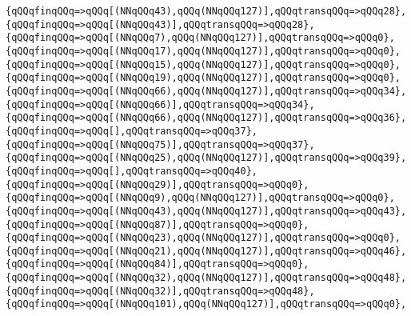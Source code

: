 \verb|{qQQqfinqQQq=>qQQq[(NNqQQq43),qQQq(NNqQQq127)],qQQqtransqQQq=>qQQq28},|\newline
\verb|{qQQqfinqQQq=>qQQq[(NNqQQq43)],qQQqtransqQQq=>qQQq28},|\newline
\verb|{qQQqfinqQQq=>qQQq[(NNqQQq7),qQQq(NNqQQq127)],qQQqtransqQQq=>qQQq0},|\newline
\verb|{qQQqfinqQQq=>qQQq[(NNqQQq17),qQQq(NNqQQq127)],qQQqtransqQQq=>qQQq0},|\newline
\verb|{qQQqfinqQQq=>qQQq[(NNqQQq15),qQQq(NNqQQq127)],qQQqtransqQQq=>qQQq0},|\newline
\verb|{qQQqfinqQQq=>qQQq[(NNqQQq19),qQQq(NNqQQq127)],qQQqtransqQQq=>qQQq0},|\newline
\verb|{qQQqfinqQQq=>qQQq[(NNqQQq66),qQQq(NNqQQq127)],qQQqtransqQQq=>qQQq34},|\newline
\verb|{qQQqfinqQQq=>qQQq[(NNqQQq66)],qQQqtransqQQq=>qQQq34},|\newline
\verb|{qQQqfinqQQq=>qQQq[(NNqQQq66),qQQq(NNqQQq127)],qQQqtransqQQq=>qQQq36},|\newline
\verb|{qQQqfinqQQq=>qQQq[],qQQqtransqQQq=>qQQq37},|\newline
\verb|{qQQqfinqQQq=>qQQq[(NNqQQq75)],qQQqtransqQQq=>qQQq37},|\newline
\verb|{qQQqfinqQQq=>qQQq[(NNqQQq25),qQQq(NNqQQq127)],qQQqtransqQQq=>qQQq39},|\newline
\verb|{qQQqfinqQQq=>qQQq[],qQQqtransqQQq=>qQQq40},|\newline
\verb|{qQQqfinqQQq=>qQQq[(NNqQQq29)],qQQqtransqQQq=>qQQq0},|\newline
\verb|{qQQqfinqQQq=>qQQq[(NNqQQq9),qQQq(NNqQQq127)],qQQqtransqQQq=>qQQq0},|\newline
\verb|{qQQqfinqQQq=>qQQq[(NNqQQq43),qQQq(NNqQQq127)],qQQqtransqQQq=>qQQq43},|\newline
\verb|{qQQqfinqQQq=>qQQq[(NNqQQq87)],qQQqtransqQQq=>qQQq0},|\newline
\verb|{qQQqfinqQQq=>qQQq[(NNqQQq23),qQQq(NNqQQq127)],qQQqtransqQQq=>qQQq0},|\newline
\verb|{qQQqfinqQQq=>qQQq[(NNqQQq21),qQQq(NNqQQq127)],qQQqtransqQQq=>qQQq46},|\newline
\verb|{qQQqfinqQQq=>qQQq[(NNqQQq84)],qQQqtransqQQq=>qQQq0},|\newline
\verb|{qQQqfinqQQq=>qQQq[(NNqQQq32),qQQq(NNqQQq127)],qQQqtransqQQq=>qQQq48},|\newline
\verb|{qQQqfinqQQq=>qQQq[(NNqQQq32)],qQQqtransqQQq=>qQQq48},|\newline
\verb|{qQQqfinqQQq=>qQQq[(NNqQQq101),qQQq(NNqQQq127)],qQQqtransqQQq=>qQQq0},|\newline
